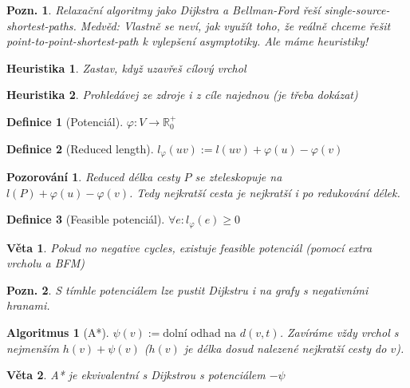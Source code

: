 \documentclass{article}
\theoremstyle{noparens}
\newtheorem*{thm}{Věta}
\newtheorem*{alg}{Algoritmus}
\newtheorem*{pozor}{Pozorování}
\newtheorem*{definition}{Definice}
\newtheorem*{heu}{Heuristika}
\theoremstyle{noparens-mys}
\theoremstyle{noparens-note}
\newtheorem*{note}{Pozn.}
\begin{document}
\begin{note}
Relaxační algoritmy jako Dijkstra a Bellman-Ford řeší
single-source-shortest-paths.  Medvěd: Vlastně se neví, jak využít toho, že
reálně chceme řešit point-to-point-shortest-path k vylepšení asymptotiky.  Ale
máme heuristiky!
\end{note}

\begin{heu}
    Zastav, když uzavřeš cílový vrchol
\end{heu}
\begin{heu}
    Prohledávej ze zdroje i z cíle najednou (je třeba dokázat)
\end{heu}

\begin{definition}[Potenciál]
    $\varphi: V \rightarrow \mathbb{R}^+_0$
\end{definition}

\begin{definition}[Reduced length]
    $l_\varphi(uv) := l(uv) + \varphi(u) - \varphi(v)$
\end{definition}

\begin{pozor}
    Reduced délka cesty $P$ se zteleskopuje na $l(P) + \varphi(u) -
    \varphi(v)$. Tedy nejkratší cesta je nejkratší i po redukování délek.
\end{pozor}

\begin{definition}[Feasible potenciál]
    $\forall e: l_\varphi(e) \ge 0$
\end{definition}

\begin{thm}
    Pokud no negative cycles, existuje feasible potenciál (pomocí extra vrcholu
    a BFM)
\end{thm}

\begin{note}
    S tímhle potenciálem lze pustit Dijkstru i na grafy s negativními hranami.
\end{note}

\begin{alg}[A*]
    $\psi(v) := \text{dolní odhad na }d(v, t)$.  Zavíráme vždy vrchol s
    nejmenším $h(v) + \psi(v)$ ($h(v)$ je délka dosud nalezené nejkratší cesty
    do $v$).
\end{alg}

\begin{thm}
    A* je ekvivalentní s Dijkstrou s potenciálem $-\psi$
\end{thm}
\end{document}
